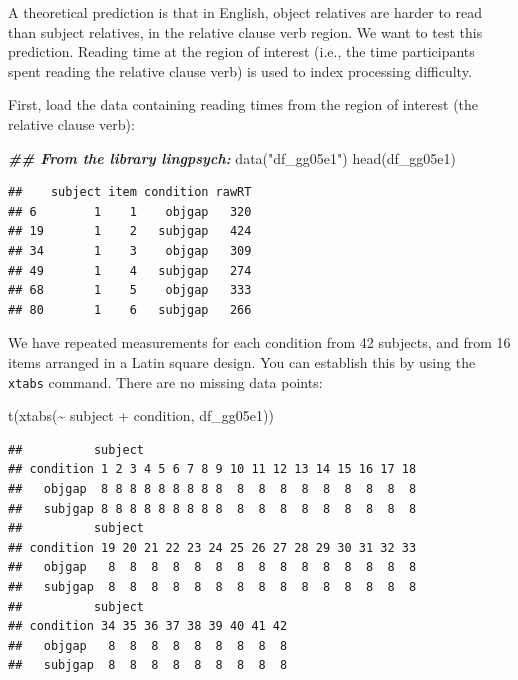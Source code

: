 \documentclass[
  12pt,
]{krantz}
\newenvironment{Shaded}{\begin{snugshade}}{\end{snugshade}}
\newcommand{\DocumentationTok}[1]{\textcolor[rgb]{0.56,0.35,0.01}{\textbf{\textit{#1}}}}
\newcommand{\FunctionTok}[1]{\textcolor[rgb]{0.00,0.00,0.00}{#1}}
\newcommand{\NormalTok}[1]{#1}
\newcommand{\SpecialCharTok}[1]{\textcolor[rgb]{0.00,0.00,0.00}{#1}}
\newcommand{\StringTok}[1]{\textcolor[rgb]{0.31,0.60,0.02}{#1}}
\theoremstyle{definition}
\theoremstyle{definition}
\theoremstyle{definition}
\theoremstyle{definition}
\theoremstyle{remark}
\begin{document}
A theoretical prediction is that in English, object relatives are harder to read than subject relatives, in the relative clause verb region. We want to test this prediction. Reading time at the region of interest (i.e., the time participants spent reading the relative clause verb) is used to index processing difficulty.

First, load the data containing reading times from the region of interest (the relative clause verb):

\begin{Shaded}
\begin{Highlighting}[]
\DocumentationTok{\#\# From the library lingpsych:}
\FunctionTok{data}\NormalTok{(}\StringTok{"df\_gg05e1"}\NormalTok{)}
\FunctionTok{head}\NormalTok{(df\_gg05e1)}
\end{Highlighting}
\end{Shaded}

\begin{verbatim}
##    subject item condition rawRT
## 6        1    1    objgap   320
## 19       1    2   subjgap   424
## 34       1    3    objgap   309
## 49       1    4   subjgap   274
## 68       1    5    objgap   333
## 80       1    6   subjgap   266
\end{verbatim}

We have repeated measurements for each condition from 42 subjects, and from 16 items arranged in a Latin square design. You can establish this by using the \texttt{xtabs} command. There are no missing data points:

\begin{Shaded}
\begin{Highlighting}[]
\FunctionTok{t}\NormalTok{(}\FunctionTok{xtabs}\NormalTok{(}\SpecialCharTok{\textasciitilde{}}\NormalTok{ subject }\SpecialCharTok{+}\NormalTok{ condition, df\_gg05e1))}
\end{Highlighting}
\end{Shaded}

\begin{verbatim}
##          subject
## condition 1 2 3 4 5 6 7 8 9 10 11 12 13 14 15 16 17 18
##   objgap  8 8 8 8 8 8 8 8 8  8  8  8  8  8  8  8  8  8
##   subjgap 8 8 8 8 8 8 8 8 8  8  8  8  8  8  8  8  8  8
##          subject
## condition 19 20 21 22 23 24 25 26 27 28 29 30 31 32 33
##   objgap   8  8  8  8  8  8  8  8  8  8  8  8  8  8  8
##   subjgap  8  8  8  8  8  8  8  8  8  8  8  8  8  8  8
##          subject
## condition 34 35 36 37 38 39 40 41 42
##   objgap   8  8  8  8  8  8  8  8  8
##   subjgap  8  8  8  8  8  8  8  8  8
\end{verbatim}
\end{document}
